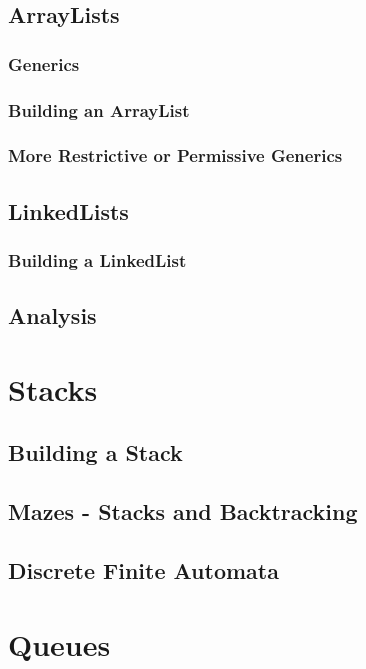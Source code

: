 \documentclass[10pt,a4paper]{book}
\begin{document}
\section{ArrayLists}

\subsection{Generics}
\subsection{Building an ArrayList}

\subsection{More Restrictive or Permissive Generics}


\section{LinkedLists}
\subsection{Building a LinkedList}

\section{Analysis}
\chapter{Stacks}

\section{Building a Stack}

\section{Mazes - Stacks and Backtracking}



\section{Discrete Finite Automata}

\chapter{Queues}
\end{document}
